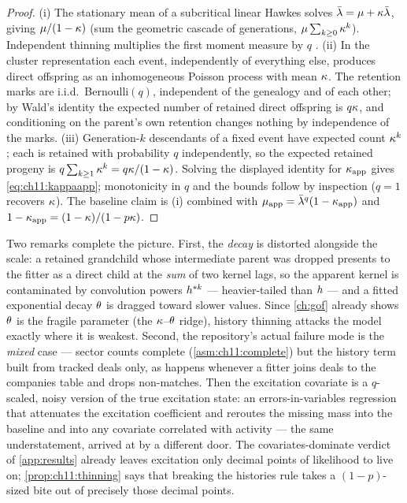 \begin{proof}
(i) The stationary mean of a subcritical linear Hawkes solves
$\bar{\lambda} = \mu + \kappa\bar{\lambda}$, giving $\mu/(1-\kappa)$ (sum the
geometric cascade of generations, $\mu\sum_{k\ge0}\kappa^k$).
Independent thinning multiplies the first moment measure by $q$
\citep[Ch.~11]{daley2003}.
(ii) In the cluster representation each event, independently of
everything else, produces direct offspring as an inhomogeneous Poisson
process with mean $\kappa$. The retention marks are i.i.d.\
Bernoulli$(q)$, independent of the genealogy and of each other; by
Wald's identity the expected number of retained direct offspring is
$q\kappa$, and conditioning on the parent's own retention changes
nothing by independence of the marks.
(iii) Generation-$k$ descendants of a fixed event have expected count
$\kappa^k$; each is retained with probability $q$ independently, so the
expected retained progeny is $q\sum_{k\ge1}\kappa^k =
q\kappa/(1-\kappa)$. Solving the displayed identity for
$\kappa_{\mathrm{app}}$ gives \cref{eq:ch11:kappaapp}; monotonicity in
$q$ and the bounds follow by inspection ($q=1$ recovers $\kappa$). The
baseline claim is (i) combined with
$\mu_{\mathrm{app}} = \bar{\lambda}^q(1-\kappa_{\mathrm{app}})$ and
$1-\kappa_{\mathrm{app}} = (1-\kappa)/(1-p\kappa)$.
\end{proof}

Two remarks complete the picture. First, the \emph{decay} is distorted
alongside the scale: a retained grandchild whose intermediate parent was
dropped presents to the fitter as a direct child at the \emph{sum} of two
kernel lags, so the apparent kernel is contaminated by convolution powers
$h^{*k}$ --- heavier-tailed than $h$ --- and a fitted
exponential decay $\theta$ is dragged toward slower values. Since
\cref{ch:gof} already shows $\theta$ is the fragile parameter
(the $\kappa$--$\theta$ ridge), history thinning attacks the model
exactly where it is weakest. Second, the repository's actual failure mode
is the \emph{mixed} case --- sector counts complete
(\cref{asm:ch11:complete}) but the history term built from tracked deals
only, as happens whenever a fitter joins deals to the companies table and
drops non-matches. Then the excitation covariate is a $q$-scaled, noisy
version of the true excitation state: an errors-in-variables regression
that attenuates the excitation coefficient and reroutes the missing mass
into the baseline and into any covariate correlated with activity --- the
same understatement, arrived at by a different door. The
covariates-dominate verdict of \cref{app:results} already leaves
excitation only decimal points of likelihood to live on;
\cref{prop:ch11:thinning} says that breaking the histories rule takes a
$(1-p)$-sized bite out of precisely those decimal points.

